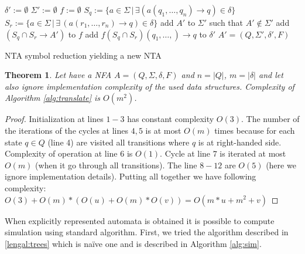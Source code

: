 \documentclass[a4paper, 12pt]{article}
\newtheorem{theorem}{Theorem}
\begin{document}
\begin{algorithm}[h]
    $\delta' := \emptyset $\;
    $\Sigma' := \emptyset $\;
	$f := \emptyset$\;
    {
		{
			$S_q := \{ a\in \Sigma \,|\, \exists(a(q_1,\ldots,q_n) \rightarrow q) \in \delta\}$\;
			{
				$S_r := \{a\in \Sigma \,|\, \exists\, (a(r_1,\ldots,r_n) \rightarrow q) \in \delta\}$\;
				{
					add $A'$ to $\Sigma'$ such that $A' \not\in \Sigma'$\;
					add $(S_q \cap S_r \rightarrow A')$ to $f$\;
				}
				add $f(S_q \cap S_r)(q_1,\ldots,) \rightarrow q$ to $\delta'$\;
			}
		}
    }
	\Return $A' = (Q, \Sigma', \delta', F)$
\caption{NTA symbol reduction yielding a new NTA}
\label{alg:translate}
\end{algorithm}


\begin{theorem}
Let have a NFA $A = (Q, \Sigma, \delta, F)$ and $n = |Q|$, $m = |\delta|$ and let also ignore implementation
complexity of the used data structures.
Complexity of Algorithm \ref{alg:translate} is $O(m^2)$.
\end{theorem}
\begin{proof}
Initialization at lines $1-3$ has constant complexity $O(3)$.
The number of the iterations of the cycles at lines $4,5$ is at most $O(m)$ times because for each state $q\in Q$ (line 4) are
visited all transitions where $q$ is at right-handed side.
Complexity of operation at line $6$ is $O(1)$.
Cycle at line $7$ is iterated at most $O(m)$ (when it go through all transitions).
The line $8-12$ are $O(5)$ (here we ignore implementation details).
Putting all together we have following complexity: $O(3) + O(m)*(O(u)+O(m)*O(v)) = O(m*u + m^2+v)$
\end{proof}

When explicitly represented automata is obtained it is possible to compute simulation using standard algorithm.
First, we tried the algorithm described in \ref{lengal:trees} which is na{\"i}ve one and is described in Algorithm \ref{alg:sim}.
\end{document}
